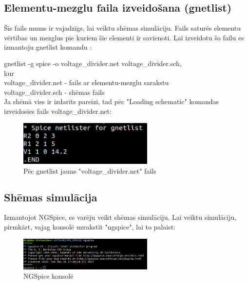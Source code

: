 \documentclass{article}
\begin{document}
    \newpage
    \subsection{Elementu-mezglu faila izveidošana (gnetlist)}
        Šīs fails mums ir vajadzīgs, lai veiktu shēmas simulāciju. Fails saturēs elementu vērtības un mezglus pie kuriem šie elementi ir savienoti. Lai izveidotu šo failu es izmantoju gnetlist komandu :
        
        gnetlist -g spice -o voltage\_divider.net voltage\_divider.sch,\\
        kur\\
        voltage\_divider.net - fails ar elementu-mezglu sarakstu\\
        voltage\_divider.sch - shēmas fails\\
        
         Ja shēmā viss ir izdarīts pareizi, tad pēc "Loading schematic" komandas izveidosies fails voltage\_divider.net:
         
         \begin{figure}[H]\centering\includegraphics[width=0.60\textwidth]{pictures/gnetlist.PNG}\caption{Pēc gnetlist jauns "voltage\_divider.net" fails}\label{picture:10lw5p}\end{figure}
         
    \subsection{Shēmas simulācija}
        Izmantojot NGSpice, es varēju veikt shēmas simulāciju.
        Lai veiktu simulāciju, pirmkārt, vajag konsolē uzrakstīt "ngspice", lai to palaist:
        
         \begin{figure}[H]\centering\includegraphics[width=0.60\textwidth]{pictures/ngspice1.PNG}\caption{NGSpice konsolē}\label{picture:10lw6p}\end{figure}
        
\end{document}
